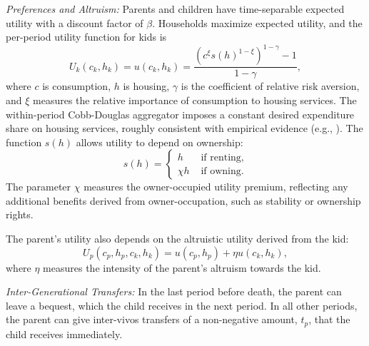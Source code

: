 \documentclass[12pt]{article}
\begin{document}
\textit{Preferences and Altruism:} Parents and children have time-separable expected utility with a discount factor of $\beta$. Households maximize expected utility, and the per-period utility function for kids is
\begin{equation}
U_k(c_k,h_k) = u(c_k,h_k) = \frac{\left(c^\xi s(h)^{1-\xi}\right)^{1-\gamma}-1}{1-\gamma},
\end{equation}
where $c$ is consumption, $h$ is housing, $\gamma$ is the coefficient of relative risk aversion, and $\xi$ measures the relative importance of consumption to housing services. The within-period Cobb-Douglas aggregator imposes a constant desired expenditure share on housing services, roughly consistent with empirical evidence (e.g., \cite{davis2011household}). The function $s(h)$ allows utility to depend on ownership:
\begin{equation}
s(h) = \begin{cases}
h & \text{ if renting}, \\
\chi h & \text{ if owning}.
\end{cases}
\end{equation}
The parameter $\chi$ measures the owner-occupied utility premium, reflecting any additional benefits derived from owner-occupation, such as stability or ownership rights.

The parent's utility also depends on the altruistic utility derived from the kid:
\begin{equation}
U_p(c_p,h_p,c_k,h_k) = u(c_p,h_p) + \eta u(c_k,h_k),
\end{equation}
where $\eta$ measures the intensity of the parent's altruism towards the kid.

\textit{Inter-Generational Transfers:} In the last period before death, the parent can leave a bequest, which the child receives in the next period. In all other periods, the parent can give inter-vivos transfers of a non-negative amount, $t_p$, that the child receives immediately.
\end{document}
